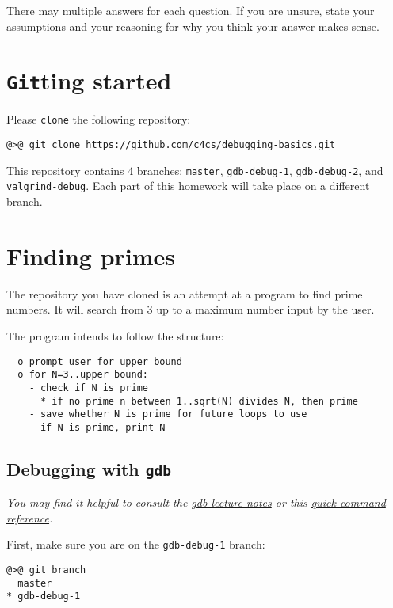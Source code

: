 \documentclass{article}
\begin{document}


There may multiple answers for each question. If you are unsure,
state your assumptions and your reasoning for why you think your answer
makes sense.


\newpage
\section{\texttt{Git}ting started}

Please \texttt{clone} the following repository:

\begin{lstlisting}
@>@ git clone https://github.com/c4cs/debugging-basics.git
\end{lstlisting}

This repository contains 4 branches: \texttt{master}, \texttt{gdb-debug-1}, \texttt{gdb-debug-2}, and \texttt{valgrind-debug}. Each part of this homework will take place on a different branch.

\section{Finding primes}

The repository you have cloned is an attempt at a program to find prime
numbers. It will search from 3 up to a maximum number input by the user.

The program intends to follow the structure:
\begin{lstlisting}
  o prompt user for upper bound
  o for N=3..upper bound:
    - check if N is prime
      * if no prime n between 1..sqrt(N) divides N, then prime
    - save whether N is prime for future loops to use
    - if N is prime, print N
\end{lstlisting}

\subsection{Debugging with \texttt{gdb}}

\emph{You may find it helpful to consult the
  \href{https://c4cs.github.io/lectures/f17/week11}{gdb lecture notes}
  or this
  \href{https://ccrma.stanford.edu/~jos/stkintro/Useful_commands_gdb.html}
  {quick command reference}.
}



First, make sure you are on the \texttt{gdb-debug-1} branch:
\begin{lstlisting}
@>@ git branch
  master
* gdb-debug-1
\end{lstlisting}
\end{document}
